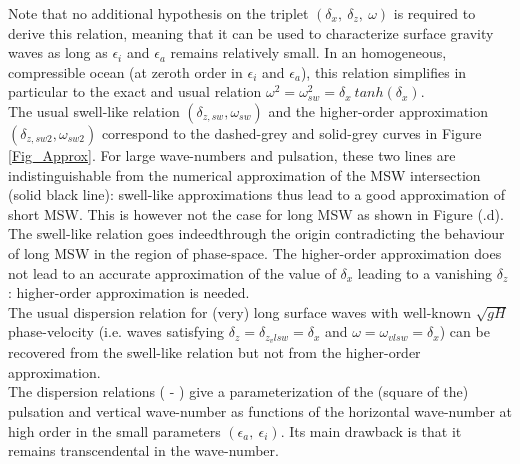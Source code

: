 \documentclass[a4paper,11pt]{article}
\begin{document}
Note that no additional hypothesis on the triplet $(\delta_x,\ \delta_z,\ \omega)$ is required to derive this relation, meaning that it can be used to characterize surface gravity waves as long as $\epsilon_i$ and $\epsilon_a$ remains relatively small. In an homogeneous, compressible ocean (at zeroth order in $\epsilon_i$ and $\epsilon_a$), this relation simplifies in particular to the exact and usual relation $\omega^2=\omega_{sw}^2 = \delta_x\ tanh(\delta_x)$.\\
The usual swell-like relation $(\delta_{z,sw},\omega_{sw})$ and the higher-order approximation $(\delta_{z,sw2},\omega_{sw2})$ correspond to the dashed-grey and solid-grey curves in Figure \ref{Fig_Approx}.
For large wave-numbers and pulsation, these two lines are indistinguishable from the numerical approximation of the MSW intersection (solid black line): swell-like approximations thus lead to a good approximation of short MSW. This is however not the case for long MSW as shown in Figure (.d). The swell-like relation goes indeedthrough the origin contradicting the behaviour of long MSW in the region of phase-space. The higher-order approximation does not lead to an accurate approximation of the value of $\delta_x$ leading to a vanishing $\delta_z$: higher-order approximation is needed.\\
The usual dispersion relation for (very) long surface waves with well-known $\sqrt{g H}$ phase-velocity (i.e. waves satisfying $\delta_z=\delta_{z_vlsw}=\delta_x$ and $\omega=\omega_{vlsw}=\delta_x$) can be recovered from the swell-like relation but not from the higher-order approximation. \\
The dispersion relations ( - ) give a parameterization of the (square of the) pulsation and vertical wave-number as functions of the horizontal wave-number at high order in the small parameters $(\epsilon_a,\ \epsilon_i)$. Its main drawback is that it remains transcendental in the wave-number.\\

\end{document}
